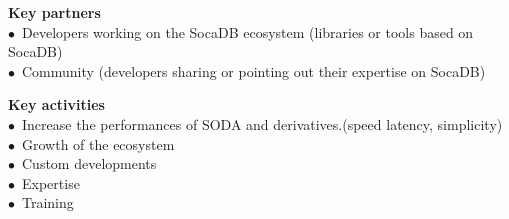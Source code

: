 \documentclass[a4paper,10pt]{scrreprt}
\begin{document}
    \begin{sideways}
    \begin{small}
    \begin{minipage}{\textheight}
     
    \hrulefill \medskip
    
    \begin{minipage}[t]{0.19\textheight}
    \begin{flushleft}
        \textbf{\color{MSBlue}\large Key partners}\\
        $\bullet$~Developers working on the SocaDB ecosystem (libraries or tools based on SocaDB)\\
        $\bullet$~Community (developers sharing or pointing out their expertise on SocaDB)
    \end{flushleft}
    \end{minipage}
    \hfill
    \begin{minipage}[t]{0.19\textheight}
        \begin{minipage}[t]{\textwidth}
        \begin{flushleft}
            \textbf{\color{MSBlue}\large Key activities}\\
            $\bullet$~Increase the performances of SODA and derivatives.(speed latency, simplicity)\\
            $\bullet$~Growth of the ecosystem\\
            $\bullet$~Custom developments\\
            $\bullet$~Expertise\\
            $\bullet$~Training
        \end{flushleft}
        \end{minipage}
        
        \vspace{1.0em} \hrulefill \medskip
        

\end{minipage}
\end{minipage}
\end{small}
\end{sideways}
\end{document}
